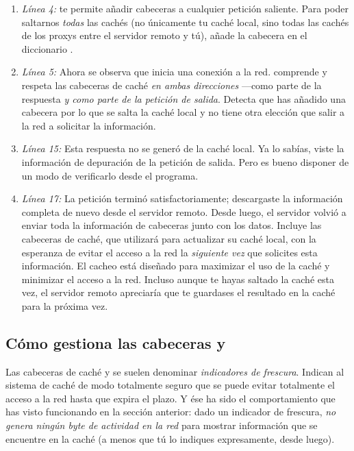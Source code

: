 \begin{enumerate}

\item \emph{Línea 4:}  te permite añadir cabeceras  a cualquier petición saliente. Para poder saltarnos \emph{todas} las cachés (no únicamente tu caché local, sino todas las cachés de los proxys entre el servidor remoto y tú), añade la cabecera  en el diccionario .


\item \emph{Línea 5:} Ahora se observa que  inicia una conexión a la red.  comprende y respeta las cabeceras de caché \emph{en ambas direcciones} ---como parte de la respuesta \emph{y como parte de la petición de salida}. Detecta que has añadido una cabecera  por lo que se salta la caché local y no tiene otra elección que salir a la red a solicitar la información.

\item \emph{Línea 15:} Esta respuesta no se generó de la caché local. Ya lo sabías, viste la información de depuración de la petición de salida. Pero es bueno disponer de un modo de verificarlo desde el programa.

\item \emph{Línea 17:} La petición terminó satisfactoriamente; descargaste la información completa de nuevo desde el servidor remoto. Desde luego, el servidor volvió a enviar toda la información de cabeceras junto con los datos. Incluye las cabeceras de caché, que  utilizará para actualizar su caché local, con la esperanza de evitar el acceso a la red la \emph{siguiente vez} que solicites esta información. El cacheo  está diseñado para maximizar el uso de la caché y minimizar el acceso a la red. Incluso aunque te hayas saltado la caché esta vez, el servidor remoto apreciaría que te guardases el resultado en la caché para la próxima vez.

\end{enumerate}


\subsection{Cómo  gestiona las cabeceras  y }

Las cabeceras de caché  y  se suelen denominar \emph{indicadores de frescura}. Indican al sistema de caché de modo totalmente seguro que se puede evitar totalmente el acceso a la red hasta que expira el plazo. Y ése ha sido el comportamiento que has visto funcionando en la sección anterior: dado un indicador de frescura,  \emph{no genera ningún byte de actividad en la red} para mostrar información que se encuentre en la caché (a menos que tú lo indiques expresamente, desde luego).

